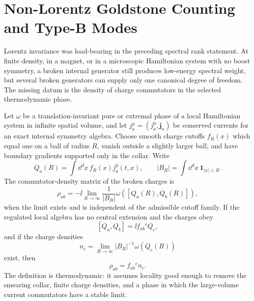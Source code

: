 \section{Non-Lorentz Goldstone Counting and Type-B Modes}
\label{sec:nonlorentz-goldstone-counting}

Lorentz invariance was load-bearing in the preceding spectral rank statement.
At finite density, in a magnet, or in a microscopic Hamiltonian system with no
boost symmetry, a broken internal generator still produces low-energy
spectral weight, but several broken generators can supply only one canonical
degree of freedom.  The missing datum is the density of charge commutators in
the selected thermodynamic phase.

\begin{definition}
\label{def:thermodynamic-commutator-density-matrix}
Let \(\omega\) be a translation-invariant pure or extremal phase of a local
Hamiltonian system in infinite spatial volume, and let
\(j_a^\mu=(j_a^0,\mathbf j_a)\) be conserved currents for an exact internal
symmetry algebra.  Choose smooth charge cutoffs \(f_R(x)\) which equal one on
a ball of radius \(R\), vanish outside a slightly larger ball, and have
boundary gradients supported only in the collar.  Write
\[
  Q_a(R)=\int\dd^d x\,f_R(x)j_a^0(t,x),
  \qquad
  |B_R|=\int\dd^d x\,\mathbf 1_{|x|<R}.
\]
The commutator-density matrix of the broken charges is
\begin{equation}
  \rho_{ab}
  =
  -\ii\lim_{R\to\infty}
  \frac{1}{|B_R|}
  \omega\!\left([Q_a(R),Q_b(R)]\right),
  \label{eq:goldstone-commutator-density-matrix}
\end{equation}
when the limit exists and is independent of the admissible cutoff family.
If the regulated local algebra has no central extension and the charges obey
\[
  [Q_a,Q_b]=\ii f_{ab}{}^c Q_c,
\]
and if the charge densities
\[
  n_c=\lim_{R\to\infty}|B_R|^{-1}\omega(Q_c(R))
\]
exist, then
\[
  \rho_{ab}=f_{ab}{}^c n_c .
\]
The definition is thermodynamic: it assumes locality good enough to remove
the smearing collar, finite charge densities, and a phase in which the
large-volume current commutators have a stable limit.
\end{definition}

